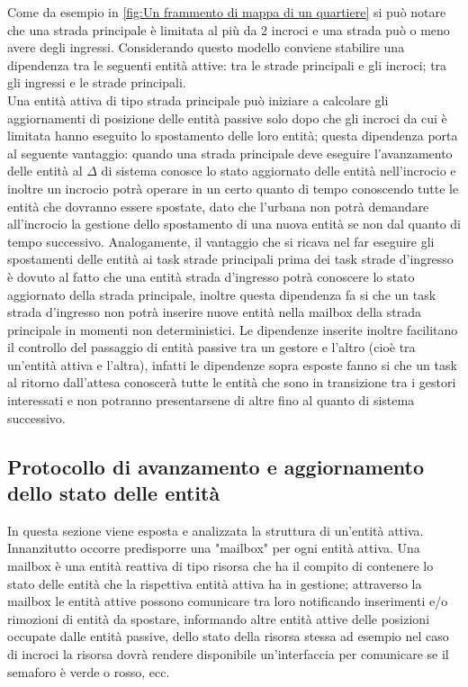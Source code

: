 Come da esempio in \ref{fig:Un frammento di mappa di un quartiere} si può notare che una strada principale è limitata al più da 2 incroci e una strada può o meno avere degli ingressi. Considerando questo modello conviene stabilire una dipendenza tra le seguenti entità attive: tra le strade principali e gli incroci; tra gli ingressi e le strade principali. \\
Una entità attiva di tipo strada principale può iniziare a calcolare gli aggiornamenti di posizione delle entità passive solo dopo che gli incroci da cui è limitata hanno eseguito lo spostamento delle loro entità; questa dipendenza porta al seguente vantaggio: quando una strada principale deve eseguire l'avanzamento delle entità al $\Delta$ di sistema conosce lo stato aggiornato delle entità nell'incrocio e inoltre un incrocio potrà operare in un certo quanto di tempo conoscendo tutte le entità che dovranno essere spostate, dato che l'urbana non potrà demandare all'incrocio la gestione dello spostamento di una nuova entità se non dal quanto di tempo successivo. Analogamente, il vantaggio che si ricava nel far eseguire gli spostamenti delle entità ai task strade principali prima dei task strade d'ingresso è dovuto al fatto che una entità strada d'ingresso potrà conoscere lo stato aggiornato della strada principale, inoltre questa dipendenza fa si che un task strada d'ingresso non potrà inserire nuove entità nella mailbox della strada principale in momenti non deterministici. Le dipendenze inserite inoltre facilitano il controllo del passaggio di entità passive tra un gestore e l'altro (cioè tra un'entità attiva e l'altra), infatti le dipendenze sopra esposte fanno si che un task al ritorno dall'attesa conoscerà tutte le entità che sono in transizione tra i gestori interessati e non potranno presentarsene di altre fino al quanto di sistema successivo.

\subsection{Protocollo di avanzamento e aggiornamento dello stato delle entità}
In questa sezione viene esposta e analizzata la struttura di un'entità attiva. Innanzitutto occorre predisporre una "mailbox" per ogni entità attiva. Una mailbox è una entità reattiva di tipo risorsa che ha il compito di contenere lo stato delle entità che la rispettiva entità attiva ha in gestione; attraverso la mailbox le entità attive possono comunicare tra loro notificando inserimenti e/o rimozioni di entità da spostare, informando altre entità attive delle posizioni occupate dalle entità passive, dello stato della risorsa stessa ad esempio nel caso di incroci la risorsa dovrà rendere disponibile un'interfaccia per comunicare se il semaforo è verde o rosso, ecc.

